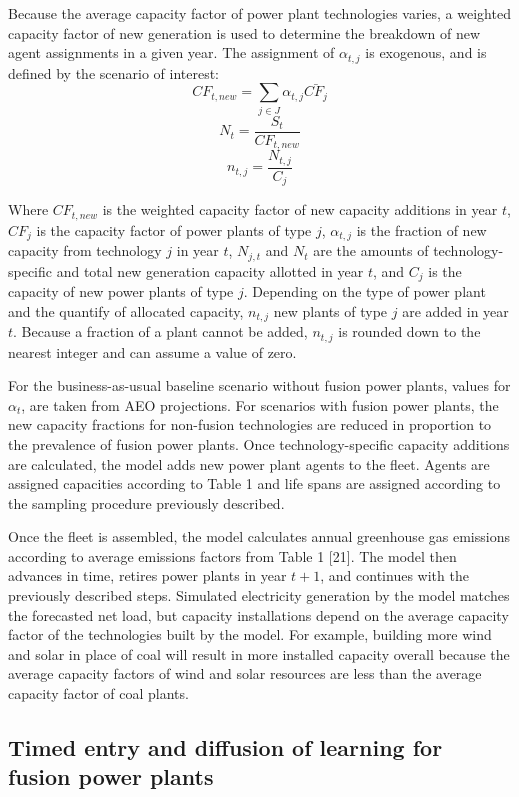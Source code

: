 \documentclass[preprint, 12pt]{elsarticle}
\begin{document}
Because the average capacity factor of power plant technologies varies, a weighted capacity factor of new generation is used to determine the breakdown of new agent assignments in a given year. The assignment of $\alpha_{t,j}$ is exogenous, and is defined by the scenario of interest:
$$ CF_{t,new} = \sum_{j \in J} \alpha_{t,j} \bar{CF_{j}}$$ $$N_t=\frac{S_t}{CF_{t,new}}$$ 
$$n_{t,j} = \frac{N_{t,j}}{C_j}$$

Where $CF_{t,new}$ is the weighted capacity factor of new capacity additions in year $t$, $CF_j$ is the capacity factor of power plants of type $j$, $\alpha_{t, j}$ is the fraction of new capacity from technology $j$ in year $t$, $N_{j,t}$ and $N_t$ are the amounts of technology-specific and total new generation capacity allotted in year $t$, and $C_j$ is the capacity of new power plants of type $j$. Depending on the type of power plant and the quantify of allocated capacity, $n_{t,j}$ new plants of type $j$ are added in year $t$. Because a fraction of a plant cannot be added, $n_{t,j}$ is rounded down to the nearest integer and can assume a value of zero.

For the business-as-usual baseline scenario without fusion power plants, values for $\alpha_t$, are taken from AEO projections. For scenarios with fusion power plants, the new capacity fractions for non-fusion technologies are reduced in proportion to the prevalence of fusion power plants. Once technology-specific capacity additions are calculated, the model adds new power plant agents to the fleet. Agents are assigned capacities according to Table 1 and life spans are assigned according to the sampling procedure previously described. 

Once the fleet is assembled, the model calculates annual greenhouse gas emissions according to average emissions factors from Table 1 [21]. The model then advances in time, retires power plants in year $t+1$, and continues with the previously described steps. Simulated electricity generation by the model matches the forecasted net load, but capacity installations depend on the average capacity factor of the technologies built by the model. For example, building more wind and solar in place of coal will result in more installed capacity overall because the average capacity factors of wind and solar resources are less than the average capacity factor of coal plants.

\subsection{Timed entry and diffusion of learning for fusion power plants}
\end{document}
